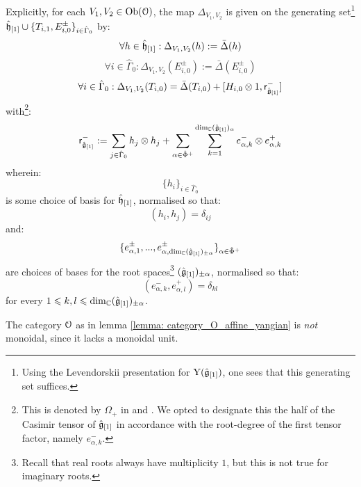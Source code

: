 \begin{lemma}
            Explicitly, for each $V_1, V_2 \in \mathrm{Ob}(\mathcal{O})$, the map $\Delta_{V_1, V_2}$ is given on the generating set\footnote{Using the Levendorskii presentation for $\mathrm{Y}(\hat{\mathfrak{g}}_{[1]})$, one sees that this generating set suffices.} $\hat{\mathfrak{h}}_{[1]} \cup \{T_{i, 1}, E_{i, 0}^{\pm}\}_{i \in \hat{\Gamma}_0}$ by:
                $$\forall h \in \hat{\mathfrak{h}}_{[1]}: \Delta_{V_1, V_2}(h) := \bar{\Delta}(h)$$
                $$\forall i \in \hat{\Gamma}_0: \Delta_{V_1, V_2}(E_{i, 0}^{\pm}) := \bar{\Delta}(E_{i, 0}^{\pm})$$
                $$\forall i \in \hat{\Gamma}_0: \Delta_{V_1, V_2}(T_{i, 0}) = \bar{\Delta}(T_{i, 0}) + [H_{i, 0} \tensor 1, \sfr_{ \hat{\g}_{[1]} }^-]$$
            with\footnote{This is denoted by $\Omega_+$ in \cite{guay_nakajima_wendlandt_affine_yangian_coproduct} and \cite{guay_nakajima_wendlandt_affine_yangian_vertex_representations_and_PBW}. We opted to designate this the  half of the Casimir tensor of $\hat{\mathfrak{g}}_{[1]}$ in accordance with the root-degree of the first tensor factor, namely $e_{\alpha, k}^-$.}:
                $$\sfr_{ \hat{\g}_{[1]} }^- := \sum_{j \in \hat{\Gamma}_0} h_j \tensor h_j + \sum_{\alpha \in \hat{\Phi}^+} \sum_{k = 1}^{ \dim_{\bbC} (\hat{\g}_{[1]})_{\alpha} } e_{\alpha, k}^- \tensor e_{\alpha, k}^+$$
            wherein:
                $$\{h_i\}_{i \in \hat{\Gamma}_0}$$
            is some choice of basis for $\hat{\mathfrak{h}}_{[1]}$, normalised so that:
                $$(h_i, h_j) = \delta_{ij}$$
            and:
                $$\{ e_{\alpha, 1}^{\pm}, ..., e_{\alpha, \dim_{\mathbb{C}} (\hat{\mathfrak{g}}_{[1]})_{\pm \alpha}}^{\pm} \}_{\alpha \in \hat{\Phi}^+}$$
            are choices of bases for the root spaces\footnote{Recall that real roots always have multiplicity $1$, but this is not true for imaginary roots.} $(\hat{\mathfrak{g}}_{[1]})_{\pm\alpha}$, normalised so that:
                $$(e_{\alpha, k}^-, e_{\alpha, l}^+) = \delta_{kl}$$
            for every $1 \leqslant k, l \leqslant \dim_{\mathbb{C}} (\hat{\mathfrak{g}}_{[1]})_{\pm\alpha}$.
        \end{lemma}
        \begin{remark}
            The category $\mathcal{O}$ as in lemma \ref{lemma: category_O_affine_yangian} is \textit{not} monoidal, since it lacks a monoidal unit. 
        \end{remark}

